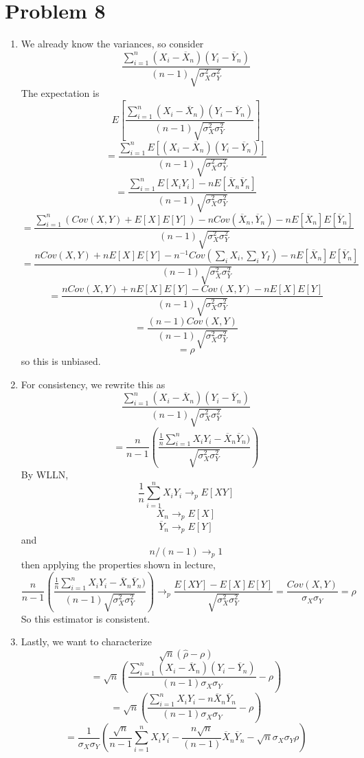 \documentclass[10pt,letter]{article}
\begin{document}
\section*{Problem 8}
\begin{enumerate}[label=(\roman*)]
\item We already know the variances, so consider
\[ \frac{\sum_{i=1}^n( X_i - \overline{X}_n)(Y_i- \overline{Y}_n)}{(n-1)\sqrt{\sigma_X^2 \sigma_Y^2}} \]
The expectation is
\[ E\left[ \frac{\sum_{i=1}^n( X_i - \overline{X}_n)(Y_i- \overline{Y}_n)}{(n-1)\sqrt{\sigma_X^2 \sigma_Y^2}}\right] \]
\[ =\frac{\sum_{i=1}^nE[( X_i - \overline{X}_n)(Y_i- \overline{Y}_n)]}{(n-1)\sqrt{\sigma_X^2 \sigma_Y^2}} \]
\[ =\frac{\sum_{i=1}^nE[ X_i Y_i] - n E [\overline{X}_n\overline{Y}_n]}{(n-1)\sqrt{\sigma_X^2 \sigma_Y^2}} \]
\[ = \frac{\sum_{i=1}^n (Cov(X,Y) + E[X]E[Y]) - n Cov(\overline{X}_n, \overline{Y}_n) - n E[\overline{X}_n]E[\overline{Y}_n]}{(n-1)\sqrt{\sigma_X^2 \sigma_Y^2}} \]
\[ = \frac{ n Cov(X,Y) + n E[X]E[Y] - n^{-1} Cov(\sum_i {X}_i, \sum_i {Y}_I) - n E[\overline{X}_n]E[\overline{Y}_n]}{(n-1)\sqrt{\sigma_X^2 \sigma_Y^2}} \]
\[ = \frac{ n Cov(X,Y) + n E[X]E[Y] -  Cov(X, Y) - n E[X]E[Y]}{(n-1)\sqrt{\sigma_X^2 \sigma_Y^2}} \]
\[ = \frac{ (n-1) Cov(X,Y)}{(n-1)\sqrt{\sigma_X^2 \sigma_Y^2}} \]
\[ = \rho \]
so this is unbiased.
\item For consistency, we rewrite this as
\[ \frac{\sum_{i=1}^n( X_i - \overline{X}_n)(Y_i- \overline{Y}_n)}{(n-1)\sqrt{\sigma_X^2 \sigma_Y^2}} \]
\[ = \frac{n}{n-1} \left(\frac{\frac{1}{n}\sum_{i=1}^n X_iY_i - \overline{X}_n\overline{Y}_n)}{\sqrt{\sigma_X^2 \sigma_Y^2}} \right) \]
By WLLN,
\[\frac{1}{n}\sum_{i=1}^n X_iY_i \to_p E[XY] \]
\[\overline{X}_n \to_p E[X] \]
\[\overline{Y}_n \to_p E[Y] \]
and
\[ n/(n-1) \to_p 1 \]
then applying the properties shown in lecture,
\[ \frac{n}{n-1} \left(\frac{\frac{1}{n}\sum_{i=1}^n X_iY_i - \overline{X}_n\overline{Y}_n)}{(n-1)\sqrt{\sigma_X^2 \sigma_Y^2}} \right) \to_p \frac{E[XY] - E[X]E[Y]}{\sqrt{\sigma_X^2 \sigma_Y^2}} = \frac{Cov(X,Y)}{\sigma_X \sigma_Y} = \rho\]
So this estimator is consistent.
\item Lastly, we want to characterize
\[ \sqrt{n} ( \hat{\rho} - \rho) \]
\[ = \sqrt{n}\left( \frac{\sum_{i=1}^n( X_i - \overline{X}_n)(Y_i- \overline{Y}_n)}{(n-1)\sigma_X\sigma_Y} - \rho \right)  \]
\[ = \sqrt{n}\left( \frac{\sum_{i=1}^n X_i Y_i - n \overline{X}_n\overline{Y}_n}{(n-1)\sigma_X\sigma_Y} - \rho \right)  \]
\[ = \frac{1}{\sigma_X\sigma_Y}\left( \frac{\sqrt{n}}{n-1} \sum_{i=1}^n X_i Y_i - \frac{ n\sqrt{n} }{(n-1)}\overline{X}_n\overline{Y}_n - \sqrt{n}\sigma_X\sigma_Y\rho \right)  \]

\end{enumerate}
\end{document}

